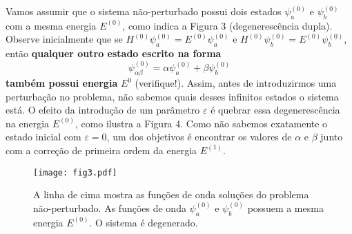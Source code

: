 \documentclass{article}
\begin{document}
Vamos assumir que o sistema não-perturbado possui dois estados $\psi_a^{(0)}$ e $\psi_b^{(0)}$ com a mesma energia $E^{(0)}$, como indica a Figura 3 (degenerescência dupla). Observe inicialmente que se $H^{(0)}\psi_a^{(0)} = E^{(0)}\psi_a^{(0)}$ e $H^{(0)}\psi_b^{(0)} = E^{(0)}\psi_b^{(0)}$, então \textbf{qualquer outro estado escrito na forma}
\begin{equation}
    \psi_{\alpha\beta}^{(0)} = \alpha\psi_a^{(0)} + \beta\psi_b^{(0)}
\end{equation}
\textbf{também possui energia} $E^{0}$ (verifique!). Assim, antes de introduzirmos uma perturbação no problema, não sabemos quais desses infinitos estados o sistema está. O efeito da introdução de um parâmetro $\varepsilon$ é quebrar essa degenerescência na energia $E^{(0)}$, como ilustra a Figura 4. Como não sabemos exatamente o estado inicial com $\varepsilon = 0$, um dos objetivos é encontrar os valores de $\alpha$ e $\beta$ junto com a correção de primeira ordem da energia $E^{(1)}$. 

\begin{figure}[h]
\centering
\texttt{[image: fig3.pdf]}
\caption{A linha de cima mostra as funções de onda soluções do problema não-perturbado. As funções de onda $\psi_a^{(0)}$ e $\psi_b^{(0)}$ possuem a mesma energia $E^{(0)}$. O sistema é degenerado.}
\end{figure}
\end{document}
